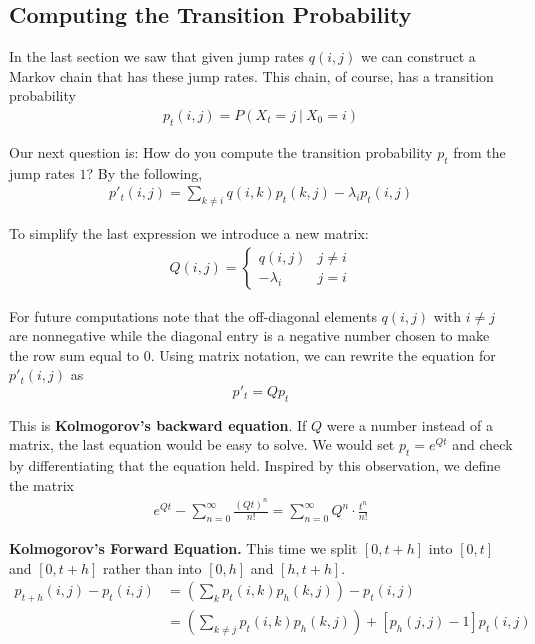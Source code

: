 \documentclass[12pt]{article}
\begin{document}

\subsection{Computing the Transition Probability}

In the last section we saw that given jump rates $q(i, j)$ we can construct a Markov chain that has these jump rates. This chain, of course, has a transition probability
\begin{align*}
p_t(i, j) = P(X_t = j \ | \ X_0 = i)
\end{align*}

Our next question is: How do you compute the transition probability $p_t$ from the jump rates $1$? By the following,
\begin{align*}
p'_t(i, j) = \sum_{k \neq i} q(i, k)p_t(k, j) - \lambda_ip_t(i,j)
\end{align*}

To simplify the last expression we introduce a new matrix:
\begin{align*}
Q(i, j) = \begin{cases} 
      q(i,j) & j \neq i \\
      -\lambda_i & j = i
   \end{cases}
\end{align*}

For future computations note that the off-diagonal elements $q(i, j)$ with $i \neq j$ are nonnegative while the diagonal entry is a negative number chosen to make the row sum equal to $0$. Using matrix notation, we can rewrite the equation for $p'_t(i,j)$ as $$p'_t = Qp_t$$

This is \textbf{Kolmogorov's backward equation}. If $Q$ were a number instead of a matrix, the last equation would be easy to solve. We would set $p_t = e^{Qt}$ and check by differentiating that the equation held. Inspired by this observation, we define the matrix
\begin{align*}
e^{Qt} - \sum_{n=0}^{\infty} \frac{(Qt)^n}{n!} = \sum_{n=0}^{\infty} Q^n \cdot \frac{t^n}{n!}
\end{align*}

\textbf{Kolmogorov's Forward Equation.} This time we split $[0, t+h]$ into $[0, t]$ and $[0, t+h]$ rather than into $[0, h]$ and $[h, t+h]$.
\begin{align*}
p_{t+h}(i,j) - p_t(i,j) &= \left( \sum_k p_t(i, k)p_h(k, j) \right) - p_t(i, j)\\
&= \left( \sum_{k \neq j} p_t(i, k)p_h(k, j) \right) + [p_h(j, j) - 1]p_t(i,j)
\end{align*}
\end{document}
